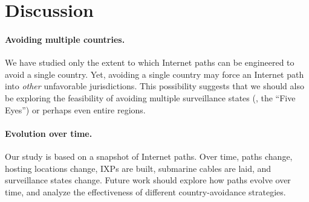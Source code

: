 \section{Discussion}
\label{sec:discussion}

\paragraph{Avoiding multiple countries.} 
We have studied only the extent to which Internet paths can be
engineered to avoid a {single} country.  Yet, avoiding a single country
may force an Internet path into {\em other} unfavorable
jurisdictions. This possibility suggests that we should also be
exploring the feasibility of avoiding multiple surveillance states (\eg,
the ``Five Eyes'') or perhaps even entire regions. 

\paragraph{Evolution over time.}
Our study is based on a snapshot of Internet paths. Over time, paths
change, hosting locations change, IXPs are built, submarine cables are
laid, and surveillance states change.  Future work should explore how
paths evolve over time, and analyze the effectiveness of different
country-avoidance strategies.



